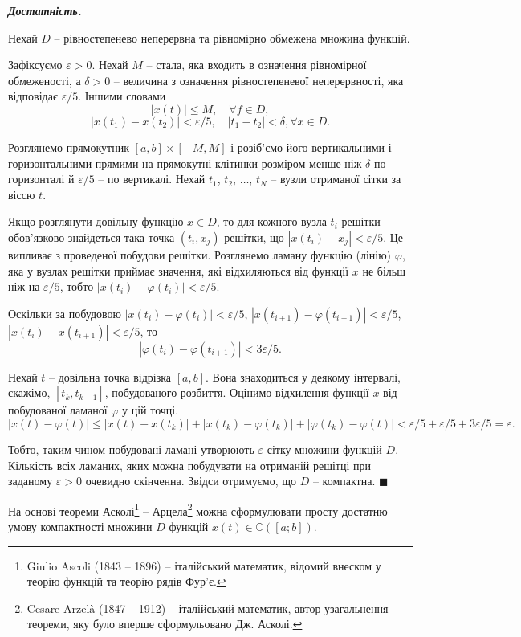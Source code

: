 \documentclass[14pt,twoside]{extreport}
\theoremstyle{mystyle}
\renewenvironment{proof}{{\bfseries Доведення.}}{$\blacksquare$}
\numberwithin{equation}{chapter}
\newcommand{\cab}{\mathbb{C}([a; b])}
\begin{document}
\begin{proof}
\emph{\textbf{Достатність.}}

Нехай $D$ -- рівностепенево неперервна та рівномірно обмежена множина функцій.

Зафіксуємо $\varepsilon>0$. Нехай $M$ -- стала, яка входить в означення рівномірної обмеженості, а $\delta>0$ -- величина з означення рівностепеневої неперервності, яка відповідає $\varepsilon/5$. Іншими словами
\[|x(t)|\leqslant M, \quad \forall f\in D,\]
\[|x(t_1)-x(t_2)|<\varepsilon/5, \quad |t_1-t_2|<\delta,\forall x\in D.\]

Розглянемо прямокутник $[a,b]\times[-M,M]$ і розіб'ємо його вертикальними і горизонтальними прямими на прямокутні клітинки розміром менше ніж $\delta$ по горизонталі й $\varepsilon/5$ -- по вертикалі. Нехай $t_1$, $t_2$, $\ldots$, $t_N$ -- вузли отриманої сітки за віссю $t$.

Якщо розглянути довільну функцію $x\in D$, то для кожного вузла $t_i$ решітки обов'язково знайдеться така точка $(t_i, x_j)$ решітки, що $|x(t_i)-x_j|<\varepsilon/5$. Це випливає з проведеної побудови решітки. Розглянемо ламану функцію (лінію) $\varphi$, яка у вузлах решітки приймає значення, які відхиляються від функції $x$ не більш ніж на $\varepsilon/5$, тобто
$|x(t_i)-\varphi(t_i)|<\varepsilon/5$.

Оскільки за побудовою $|x(t_i)-\varphi(t_i)|<\varepsilon/5$, $|x(t_{i+1}) - \varphi(t_{i+1})|<\varepsilon/5$, $|x(t_i)-x(t_{i+1})|<\varepsilon/5$, то
\[|\varphi(t_{i})-\varphi(t_{i+1})|<3\varepsilon/5.\]

Нехай $t$ -- довільна точка відрізка $[a,b]$. Вона знаходиться у деякому інтервалі, скажімо, $[t_k, t_{k+1}]$, побудованого розбиття. Оцінимо відхилення функції $x$ від побудованої ламаної $\varphi$ у цій точці.
\[|x(t)-\varphi(t)|\leqslant|x(t)-x(t_k)|+|x(t_k)-\varphi(t_k)|+|\varphi(t_k)-\varphi(t)| <\varepsilon/5+\varepsilon/5+3\varepsilon/5=\varepsilon.\]

Тобто, таким чином побудовані ламані утворюють $\varepsilon$-сітку множини функцій $D$. Кількість всіх ламаних, яких можна побудувати на отриманій решітці при заданому $\varepsilon>0$ очевидно скінченна. Звідси отримуємо, що $D$ -- компактна.
\end{proof}

На основі теореми Асколі\footnote{Giulio Ascoli (1843 --  1896) -- італійський математик, відомий внеском у теорію функцій та теорію рядів Фур'є.} -- Арцела\footnote{Cesare Arzel\`{a} (1847 -- 1912) -- італійський математик, автор узагальнення теореми, яку було вперше сформульовано Дж. Асколі.} можна сформулювати просту достатню умову компактності множини $D$ функцій $x(t) \in \cab$.
\end{document}
